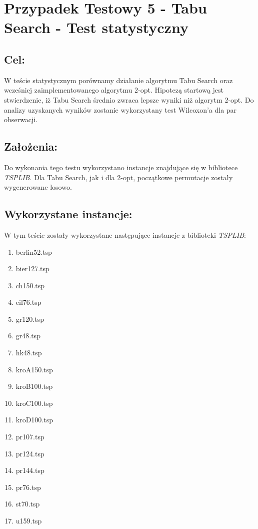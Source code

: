 \section{Przypadek Testowy 5 - Tabu Search - Test statystyczny}
  \subsection{Cel:}
    W teście statystycznym porównamy działanie algorytmu Tabu Search oraz wcześniej zaimplementowanego algorytmu 2-opt.
    Hipotezą startową jest stwierdzenie, iż Tabu Search średnio zwraca lepsze wyniki niż algorytm 2-opt.
    Do analizy uzyskanych wyników zostanie wykorzystany test Wilcoxon'a dla par obserwacji.
  \subsection{Założenia:}
    Do wykonania tego testu wykorzystano instancje znajdujące się w bibliotece \textit{TSPLIB}. Dla Tabu Search, jak i dla 2-opt, początkowe permutacje zostały wygenerowane losowo.
  \subsection{Wykorzystane instancje: }
    W tym teście zostały wykorzystane następujące instancje z biblioteki \textit{TSPLIB}:
    \begin{enumerate}
      \item berlin52.tsp
      \item bier127.tsp
      \item ch150.tsp 
      \item eil76.tsp
      \item gr120.tsp 
      \item gr48.tsp
      \item hk48.tsp
      \item kroA150.tsp
      \item kroB100.tsp
      \item kroC100.tsp
      \item kroD100.tsp
      \item pr107.tsp
      \item pr124.tsp
      \item pr144.tsp
      \item pr76.tsp
      \item st70.tsp
      \item u159.tsp
    \end{enumerate}

